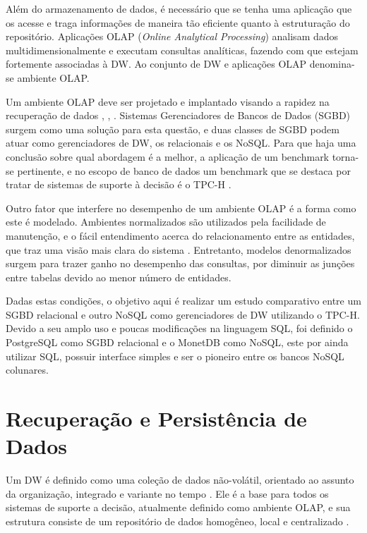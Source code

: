 \documentclass[12pt]{article}
\begin{document}
Além do armazenamento de dados, é necessário que se tenha uma aplicação que os acesse e traga informações
de maneira tão eficiente quanto à estruturação do repositório. Aplicações OLAP (\textit{Online Analytical Processing}) 
analisam dados multidimensionalmente 
e executam consultas analíticas, fazendo com que estejam fortemente associadas à DW.
Ao conjunto de DW e aplicações OLAP denomina-se ambiente OLAP.

Um ambiente OLAP deve ser projetado e implantado visando a rapidez na recuperação de dados \cite{wrembel2007data}, 
\cite{codd1998providing}, \cite{kimball2002dw}. Sistemas Gerenciadores de Bancos de Dados (SGBD) surgem como uma solução 
para esta questão, e duas classes de SGBD podem atuar como gerenciadores de DW, os relacionais e os NoSQL. 
Para que haja uma conclusão sobre qual abordagem é a melhor, a aplicação de um benchmark torna-se pertinente, 
e no escopo de banco de dados um benchmark que se destaca por tratar de sistemas de suporte à decisão é o TPC-H \cite{tpch2017page}. 

Outro fator que interfere no desempenho de um ambiente OLAP é a forma como este é modelado. 
Ambientes normalizados são utilizados pela facilidade de manutenção,
e o fácil entendimento acerca do relacionamento entre as entidades, que traz uma visão mais clara do sistema \cite{bax2003modelagem}. 
Entretanto, modelos denormalizados surgem para trazer ganho no desempenho das consultas, por diminuir 
as junções entre tabelas devido ao menor número de entidades.

Dadas estas condições, o objetivo aqui é realizar um estudo comparativo entre um SGBD relacional e outro NoSQL 
como gerenciadores de DW utilizando o TPC-H. Devido a seu amplo uso e poucas modificações na linguagem SQL, foi definido o PostgreSQL 
como SGBD relacional e o MonetDB como NoSQL, este por ainda utilizar SQL, possuir interface simples e ser o pioneiro 
entre os bancos NoSQL colunares.

\section{Recuperação e Persistência de Dados}

Um DW é definido como uma coleção de dados não-volátil, orientado ao assunto da organização, 
integrado e variante no tempo \cite{inmon2005building}. Ele é a base para todos os sistemas de 
suporte a decisão, atualmente definido como ambiente OLAP, e sua estrutura consiste de um 
repositório de dados homogêneo, local e centralizado \cite{wrembel2007data}.
\end{document}
